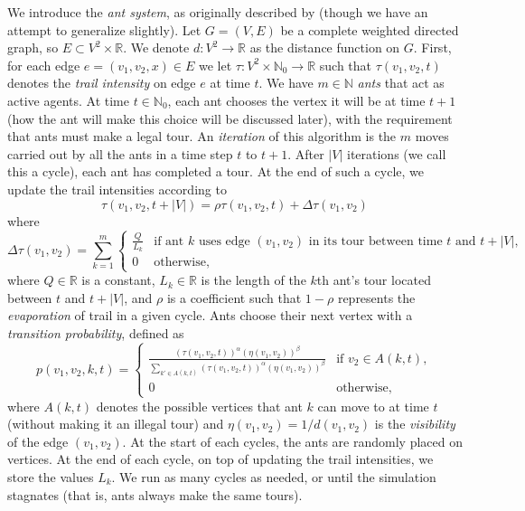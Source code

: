 We introduce the \emph{ant system}, as originally described by \textcite{dorigo1996ant} (though we have an attempt to generalize slightly). Let $G = (V, E)$ be a complete weighted directed graph, so $E \subset V^2 \times \mathbb R$. We denote $d: V^2 \to \mathbb R$ as the distance function on $G$. First, for each edge $e = (v_1, v_2, x) \in E$ we let $\tau: V^2 \times \mathbb N_0 \to \mathbb R$ such that $\tau(v_1, v_2, t)$ denotes the \emph{trail intensity} on edge $e$ at time $t$. We have $m \in \mathbb N$ \emph{ants} that act as active agents. At time $t \in \mathbb N_0$, each ant chooses the vertex it will be at time $t+1$ (how the ant will make this choice will be discussed later), with the requirement that ants must make a legal tour. An \emph{iteration} of this algorithm is the $m$ moves carried out by all the ants in a time step $t$ to $t+1$. After $\lvert V \rvert$ iterations (we call this a cycle), each ant has completed a tour. At the end of such a cycle, we update the trail intensities according to
\[
    \tau(v_1, v_2, t + \lvert V \rvert) = \rho \tau(v_1, v_2, t) + \Delta\tau(v_1, v_2)
\]
where
\[
    \Delta\tau(v_1, v_2) = \sum_{k=1}^m \begin{cases}
        \frac{Q}{L_{k}} & \text{if ant $k$ uses edge $(v_1, v_2)$ in its tour between time $t$ and $t + \lvert V \rvert$}, \\
        0               & \text{otherwise},
    \end{cases}
\]
where $Q \in \mathbb R$ is a constant, $L_{k} \in \mathbb R$ is the length of the $k$th ant's tour located between $t$ and $t + \lvert V \rvert$, and $\rho$ is a coefficient such that $1 - \rho$ represents the \emph{evaporation} of trail in a given cycle. Ants choose their next vertex with a \emph{transition probability}, defined as
\[
    p(v_1, v_2, k, t) = \begin{cases}
        \frac{
            \left(\tau(v_1, v_2, t)\right)^\alpha\left(\eta(v_1, v_2)\right)^\beta
        }{
            \sum_{k' \in A(k, t)} \left(\tau(v_1, v_2, t)\right)^\alpha\left(\eta(v_1, v_2)\right)^\beta
        } & \text{if $v_2 \in A(k, t)$}, \\
        0 & \text{otherwise},
    \end{cases}
\]
where $A(k,t)$ denotes the possible vertices that ant $k$ can move to at time $t$ (without making it an illegal tour) and $\eta(v_1, v_2) = 1/d(v_1,v_2)$ is the \emph{visibility} of the edge $(v_1, v_2)$. At the start of each cycles, the ants are randomly placed on vertices. At the end of each cycle, on top of updating the trail intensities, we store the values $L_k$. We run as many cycles as needed, or until the simulation stagnates (that is, ants always make the same tours).